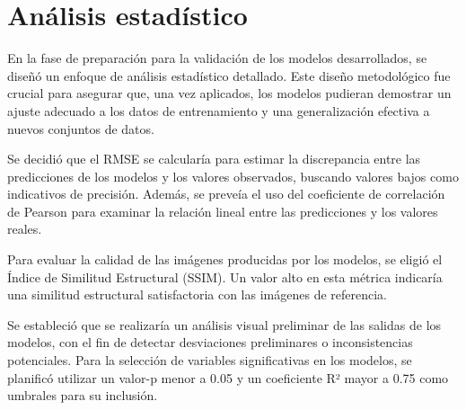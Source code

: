    \section{Análisis estadístico}
        En la fase de preparación para la validación de los modelos desarrollados, se diseñó un enfoque de análisis estadístico detallado. Este diseño metodológico fue crucial para asegurar que, una vez aplicados, los modelos pudieran demostrar un ajuste adecuado a los datos de entrenamiento y una generalización efectiva a nuevos conjuntos de datos.
        
        Se decidió que el RMSE se calcularía para estimar la discrepancia entre las predicciones de los modelos y los valores observados, buscando valores bajos como indicativos de precisión. Además, se preveía el uso del coeficiente de correlación de Pearson para examinar la relación lineal entre las predicciones y los valores reales.
        
        Para evaluar la calidad de las imágenes producidas por los modelos, se eligió el Índice de Similitud Estructural (SSIM). Un valor alto en esta métrica indicaría una similitud estructural satisfactoria con las imágenes de referencia.
        
        Se estableció que se realizaría un análisis visual preliminar de las salidas de los modelos, con el fin de detectar desviaciones preliminares o inconsistencias potenciales. Para la selección de variables significativas en los modelos, se planificó utilizar un valor-p menor a 0.05 y un coeficiente R² mayor a 0.75 como umbrales para su inclusión.